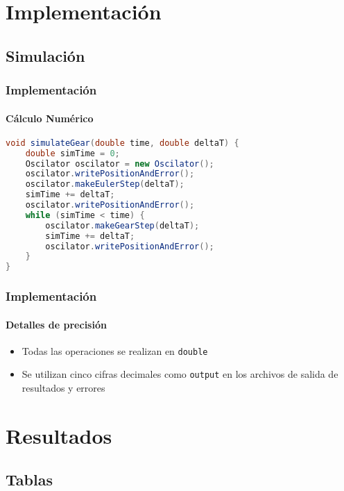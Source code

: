 \documentclass[hyperref={pdfpagelayout=SinglePage}]{beamer}
\begin{document}
\section{Implementación}

\subsection{Simulación}

\begin{frame}[fragile]
\frametitle{Implementación}
\framesubtitle{Cálculo Numérico}
\begin{lstlisting}[language=Java, caption = Método de Gear Predictor Corrector]
void simulateGear(double time, double deltaT) {
	double simTime = 0;
    Oscilator oscilator = new Oscilator();
	oscilator.writePositionAndError();
    oscilator.makeEulerStep(deltaT);
    simTime += deltaT;
	oscilator.writePositionAndError();
    while (simTime < time) {
    	oscilator.makeGearStep(deltaT);
        simTime += deltaT;
		oscilator.writePositionAndError();
    }
}
\end{lstlisting}
\end{frame}

\begin{frame}
\frametitle{Implementación}
\framesubtitle{Detalles de precisión}
\begin{itemize}
	\item Todas las operaciones se realizan en \texttt{double}
	\item Se utilizan cinco cifras decimales como \texttt{output} en los archivos de salida de resultados y errores
\end{itemize}
\end{frame}

\section{Resultados}

\subsection{Tablas}
\end{document}
